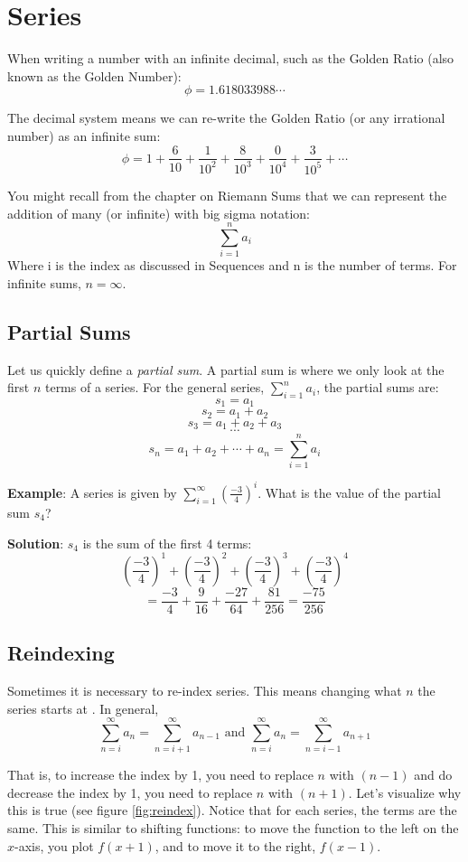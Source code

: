 \chapter{Series}
When writing a number with an infinite decimal, such as the Golden 
Ratio (also known as the Golden Number):
$$\phi = 1.618033988 \cdots$$

The decimal system means we can re-write the Golden Ratio (or any 
irrational number) as an infinite sum:
$$\phi = 1 + \frac{6}{10} + \frac{1}{10^2} + \frac{8}{10^3} + 
\frac{0}{10^4} + \frac{3}{10^5} + \cdots$$

You might recall from the chapter on Riemann Sums that we can 
represent the addition of many (or infinite) with big sigma notation:
$$\sum_{i = 1}^n a_i$$
Where i is the index as discussed in Sequences and n is the number of 
terms. For infinite sums, $n = \infty$.

\section{Partial Sums}
Let us quickly define a \textit{partial sum}. A partial sum is where 
we only look at the first $n$ terms of a series.  For the general 
series, $\sum_{i=1}^{n} a_i$, the partial sums are:
$$s_1 = a_1$$
$$s_2 = a_1 + a_2$$
$$s_3 = a_1 + a_2 + a_3$$
$$\cdots$$
$$s_n = a_1 + a_2 + \cdots + a_n = \sum_{i=1}^{n} a_i$$

\textbf{Example}: A series is given by $\sum_{i=1}^\infty 
(\frac{-3}{4})^i$. What is the value of the partial sum $s_4$?

\textbf{Solution}: $s_4$ is the sum of the first 4 terms: 
$$(\frac{-3}{4})^1 + (\frac{-3}{4})^2 + (\frac{-3}{4})^3 + (\frac{-3}{4})^4$$
$$= \frac{-3}{4} + \frac{9}{16} + \frac{-27}{64} + \frac{81}{256} = 
\frac{-75}{256}$$

\section{Reindexing}
Sometimes it is necessary to re-index series. This means changing what $n$ the 
series starts at . In general,
$$\sum_{n=i}^\infty a_n = \sum_{n=i + 1}^\infty a_{n-1} \text{ and } \sum_{n=i}^
\infty a_n = \sum_{n=i - 1}^\infty a_{n+1}$$

That is, to increase the index by 1, you need to replace $n$ with $(n-1)$ and 
do decrease the index by 1, you need to replace $n$ with $(n+1)$. Let's 
visualize why this is true (see figure \ref{fig:reindex}). Notice that for 
each series, the terms are the same. This is similar to shifting functions: 
to move the function to the left on the $x$-axis, you plot $f(x + 1)$, and to 
move it to the right, $f(x - 1)$. 

